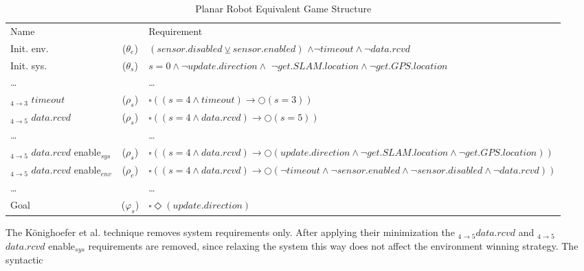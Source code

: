 \begin{center}
\begin{table}[h]
  \begin{tabular}{ L{2cm} c L{5cm} }
  \toprule
	Name  && Requirement \\
    Init. env.  &($\theta_e$) & $(sensor.disabled \veebar sensor.enabled)$ $ \wedge \neg timeout \wedge \neg data.rcvd$\\    
    Init. sys. &($\theta_s$) & $s = 0 \wedge \neg update.direction \wedge$ $\neg get.SLAM.location \wedge \neg get.GPS.location$\\
    
    \ldots  && \ldots \\
    
    $_{4 \rightarrow 3}$ $timeout$ &($\rho_s$)
    &$\square((s=4 \wedge timeout)\rightarrow \Circle(s=3))$ \\
    
    $_{4 \rightarrow 5}$ $data.rcvd$ &($\rho_s$)
    &$\square((s=4 \wedge data.rcvd)\rightarrow \Circle(s=5))$ \\
    
    \ldots  && \ldots \\
    
    $_{4\rightarrow 5}$ $data.rcvd$ enable$_{sys}$ &($\rho_s$)
    &$\square((s=4 \wedge data.rcvd)\rightarrow \Circle(update.direction \wedge \neg get.SLAM.location \wedge \neg get.GPS.location))$ \\    
    
    $_{4\rightarrow 5}$ $data.rcvd$ enable$_{env}$ &($\rho_e$)
    &$\square((s=4 \wedge data.rcvd)\rightarrow \Circle(\neg timeout \wedge \neg sensor.enabled \wedge \neg sensor.disabled \wedge \neg data.rcvd))$ \\        
    
    \ldots  && \ldots \\
    Goal   &($\varphi_s$) & $\square\Diamond(update.direction)$\\
    \bottomrule
  \end{tabular}
  \caption{Planar Robot Equivalent Game Structure}
  \label{table:planar-robot-declarative-spec}
 \end{table}
\end{center}
The Könighoefer et al. technique removes system requirements
only.  After applying their minimization the 
$_{4 \rightarrow 5} data.rcvd$ and $_{4 \rightarrow 5}$ $data.rcvd$ enable$_{sys}$ requirements are removed,
since relaxing the system this way does not affect 
the environment winning strategy.  The syntactic 
